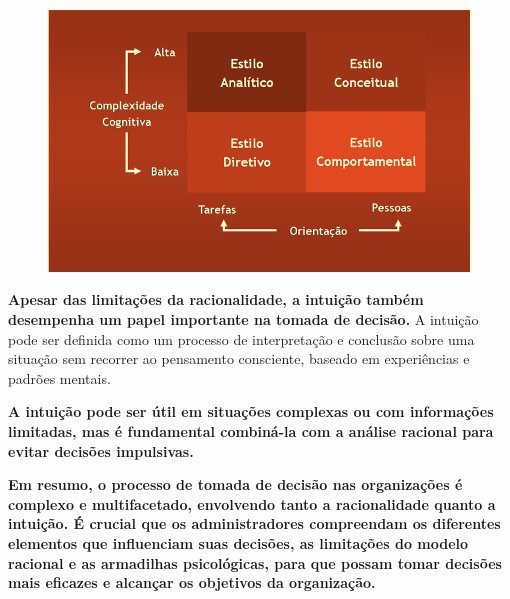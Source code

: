 \begin{figure}[H]  %
    \centering
    \begin{minipage}{0.6\textwidth}
        \centering
        \includegraphics[width=\textwidth]{img/imagem7.png}
        \label{fig:exemplo}
    \end{minipage}
\end{figure}


\textbf{Apesar das limitações da racionalidade, a intuição também desempenha um papel importante na tomada de decisão.} A intuição pode ser definida como um processo de interpretação e conclusão sobre uma situação sem recorrer ao pensamento consciente, baseado em experiências e padrões mentais.

\textbf{A intuição pode ser útil em situações complexas ou com informações limitadas, mas é fundamental combiná-la com a análise racional para evitar decisões impulsivas.}

\textbf{Em resumo, o processo de tomada de decisão nas organizações é complexo e multifacetado, envolvendo tanto a racionalidade quanto a intuição. É crucial que os administradores compreendam os diferentes elementos que influenciam suas decisões, as limitações do modelo racional e as armadilhas psicológicas, para que possam tomar decisões mais eficazes e alcançar os objetivos da organização.}